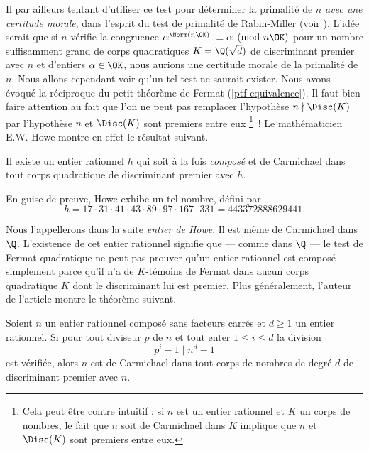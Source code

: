 Il par ailleurs tentant d'utiliser ce test pour déterminer la primalité de $n$ \emph{avec une certitude morale}, dans l'esprit du  test de primalité de Rabin-Miller (voir \cite[§ 3.3.7 p. 68]{Demazure}). L'idée serait que si $n$ vérifie la congruence $\alpha^{\Norm(n\OK)} \equiv \alpha \pmod{n\OK}$ pour un nombre \og suffisamment grand \fg{} de corps quadratiques $K = \Q(\sqrt{d})$ de discriminant premier avec $n$ et d'entiers $\alpha \in \OK$, nous aurions une certitude morale de la primalité de $n$. Nous allons cependant voir qu'un tel test ne saurait exister. Nous avons évoqué la réciproque du petit théorème de Fermat (\ref{ptf-equivalence}). Il faut bien faire attention au fait que l'on ne peut pas remplacer l'hypothèse \og $n \nmid \Disc(K)$\fg par l'hypothèse \og $n$ et $\Disc(K)$ sont premiers entre eux \fg \footnote{Cela peut être contre intuitif : si $n$ est un entier rationnel et $K$ un corps de nombres, le fait que $n$ soit de Carmichael dans $K$ implique que $n$ et $\Disc(K)$ sont premiers entre eux.}~! Le mathématicien E.W. Howe montre en effet le résultat suivant.

\begin{theoreme}[Howe, 2000]
	Il existe un entier rationnel $h$ qui soit à la fois \emph{composé} et de Carmichael dans tout corps quadratique de discriminant premier avec $h$.
\end{theoreme}

En guise de preuve, Howe exhibe un tel nombre, défini par
	\begin{equation}\label{Howe}
		h = 17 \cdot 31 \cdot 41 \cdot 43 \cdot 89 \cdot 97 \cdot 167 \cdot 331 = 443372888629441.
	\end{equation}

Nous l'appellerons dans la suite \emph{entier de Howe}. Il est même de Carmichael dans $\Q$. L'existence de cet entier rationnel signifie que — comme dans $\Q$ — le test de Fermat quadratique ne peut pas prouver qu'un entier rationnel est composé simplement parce qu'il n'a de $K$-témoins de Fermat dans aucun corps quadratique $K$ dont le discriminant lui est premier. Plus généralement, l'auteur de l'article montre le théorème suivant.

\begin{theoreme}\label{theoreme-2.7}
	Soient $n$ un entier rationnel composé sans facteurs carrés et $d\geq 1$ un entier rationnel. Si pour tout diviseur $p$ de $n$ et tout enter $1\leq i \leq d$ la division $$p^i - 1\mid n^d - 1$$ est vérifiée, alors $n$ est de Carmichael dans tout corps de nombres de degré $d$ de discriminant premier avec $n$.
\end{theoreme}

